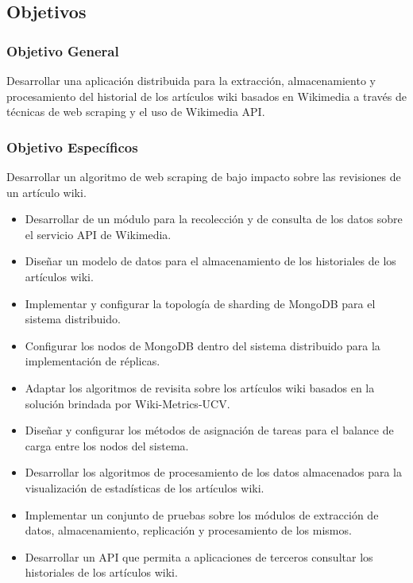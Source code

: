 \subsection{Objetivos}

\subsubsection{Objetivo General}

Desarrollar una aplicación distribuida para la extracción, almacenamiento y
procesamiento del historial de los artículos wiki basados en Wikimedia a través de
técnicas de web scraping y el uso de Wikimedia API.

\subsubsection{Objetivo Específicos}

Desarrollar un algoritmo de web scraping de bajo impacto sobre las revisiones
de un artículo wiki.

\begin{itemize}
\item Desarrollar de un módulo para la recolección y de consulta de los datos sobre el
servicio API de Wikimedia.

\item Diseñar un modelo de datos para el almacenamiento de los historiales de los
artículos wiki.

\item Implementar y configurar la topología de sharding de MongoDB para el sistema
distribuido.

\item Configurar los nodos de MongoDB dentro del sistema distribuido para la
implementación de réplicas.

\item Adaptar los algoritmos de revisita sobre los artículos wiki basados en la solución
brindada por Wiki-Metrics-UCV.

\item Diseñar y configurar los métodos de asignación de tareas para el balance de
carga entre los nodos del sistema.

\item Desarrollar los algoritmos de procesamiento de los datos almacenados para la
visualización de estadísticas de los artículos wiki.

\item Implementar un conjunto de pruebas sobre los módulos de extracción de datos,
almacenamiento, replicación y procesamiento de los mismos.

\item Desarrollar un API que permita a aplicaciones de terceros consultar los
historiales de los artículos wiki.

\end{itemize}